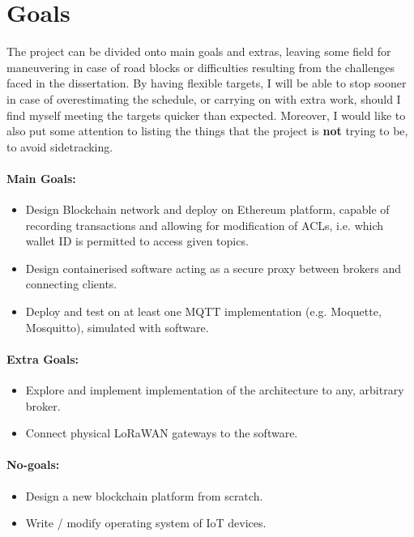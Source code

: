 \documentclass[a4paper,12pt]{article}
\begin{document}
\section*{Goals}

The project can be divided onto main goals and extras, leaving some field for maneuvering in case of road blocks or difficulties resulting from the challenges faced in the dissertation. By having flexible targets, I will be able to stop sooner in case of overestimating the schedule, or carrying on with extra work, should I find myself meeting the targets quicker than expected. Moreover, I would like to also put some attention to listing the things that the project is \textbf{not} trying to be, to avoid sidetracking.

\paragraph{Main Goals:}
\begin{itemize}
  \item Design Blockchain network and deploy on Ethereum platform, capable of recording transactions and allowing for modification of ACLs, i.e. which wallet ID is permitted to access given topics.
  \item Design containerised software acting as a secure proxy between brokers and connecting clients.
  \item Deploy and test on at least one MQTT implementation (e.g. Moquette, Mosquitto), simulated with software.
\end{itemize}

\paragraph{Extra Goals:}
\begin{itemize}
  \item Explore and implement implementation of the architecture to any, arbitrary broker.
  \item Connect physical LoRaWAN gateways to the software.
\end{itemize}

\paragraph{No-goals:}
\begin{itemize}
  \item Design a new blockchain platform from scratch.
  \item Write / modify operating system of IoT devices.
\end{itemize}
\end{document}
